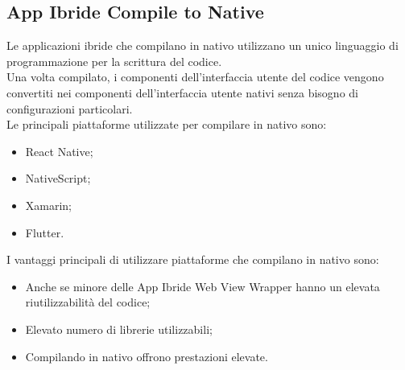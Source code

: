 \subsection{App Ibride Compile to Native}
Le applicazioni ibride che compilano in nativo \cite{apptonative} utilizzano un unico linguaggio di programmazione per la scrittura del codice.\\
 Una volta compilato, i componenti dell'interfaccia utente del codice vengono convertiti nei componenti dell'interfaccia utente nativi senza bisogno di configurazioni particolari.\\
Le principali piattaforme utilizzate per compilare in nativo sono:
\begin{itemize}
	\item React Native; 
	\item NativeScript; 
	\item Xamarin; 
	\item Flutter.
\end{itemize}
I vantaggi principali di utilizzare piattaforme che compilano in nativo sono:
\begin{itemize}
	\item Anche se minore delle App Ibride Web View Wrapper hanno un elevata riutilizzabilità del codice; 
	\item Elevato numero di librerie utilizzabili;  
	\item Compilando in nativo offrono prestazioni elevate.
\end{itemize}
\newpage
